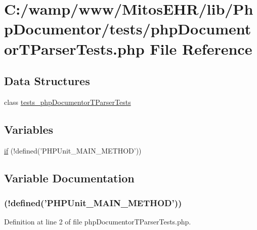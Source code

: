 \hypertarget{php_documentor_t_parser_tests_8php}{\section{\-C\-:/wamp/www/\-Mitos\-E\-H\-R/lib/\-Php\-Documentor/tests/php\-Documentor\-T\-Parser\-Tests.php \-File \-Reference}
\label{php_documentor_t_parser_tests_8php}
}
\subsection*{\-Data \-Structures}
\begin{DoxyCompactItemize}
\item 
class \hyperlink{classtests__php_documentor_t_parser_tests}{tests\-\_\-php\-Documentor\-T\-Parser\-Tests}
\end{DoxyCompactItemize}
\subsection*{\-Variables}
\begin{DoxyCompactItemize}
\item 
\hyperlink{php_documentor_t_parser_tests_8php_a3120764b3588ecfc55f4be599e83d6f9}{if} (!defined('\-P\-H\-P\-Unit\-\_\-\-M\-A\-I\-N\-\_\-\-M\-E\-T\-H\-O\-D'))
\end{DoxyCompactItemize}


\subsection{\-Variable \-Documentation}
\hypertarget{php_documentor_t_parser_tests_8php_a3120764b3588ecfc55f4be599e83d6f9}{
\subsubsection[{if}]{(!defined('\-P\-H\-P\-Unit\-\_\-\-M\-A\-I\-N\-\_\-\-M\-E\-T\-H\-O\-D'))}}\label{php_documentor_t_parser_tests_8php_a3120764b3588ecfc55f4be599e83d6f9}


\-Definition at line 2 of file php\-Documentor\-T\-Parser\-Tests.\-php.

